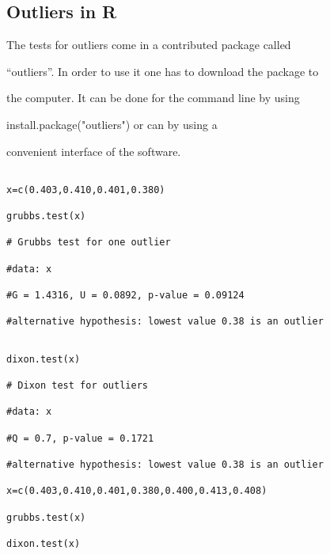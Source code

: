 

 





 



 





 



\subsection{Outliers in R}

The tests for outliers come in a contributed package called

“outliers”. In order to use it one has to download the package to

the computer. It can be done for the command line by using

install.package("outliers") or can by using a

convenient interface of the software.

\begin{verbatim}

x=c(0.403,0.410,0.401,0.380)

grubbs.test(x)

# Grubbs test for one outlier

#data: x

#G = 1.4316, U = 0.0892, p-value = 0.09124

#alternative hypothesis: lowest value 0.38 is an outlier

\end{verbatim}

 



\begin{verbatim}

dixon.test(x)

# Dixon test for outliers

#data: x

#Q = 0.7, p-value = 0.1721

#alternative hypothesis: lowest value 0.38 is an outlier

x=c(0.403,0.410,0.401,0.380,0.400,0.413,0.408)

grubbs.test(x)

dixon.test(x)

\end{verbatim}

